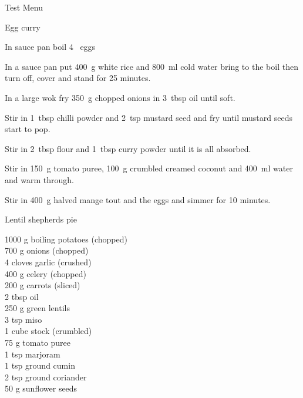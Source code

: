 \begin{menu}{Test Menu}
\begin{recipe}{2}{Egg curry}
    \begin{instructions}
    \item 
        In sauce pan boil
        4~  eggs\item 
      In a
      sauce pan
      put
      400~g  white rice
      and
      800~ml  cold water
      bring to the boil then turn off, cover and stand for 25 minutes.
    \item 
        In a large wok fry
        350~g chopped onions
        in
        3~tbsp  oil
        until soft.
      \item 
        Stir in 1~tbsp  chilli powder
        and
        2~tsp  mustard seed
        and fry until mustard seeds start to pop.
      \item 
        Stir in
        2~tbsp  flour
        and
        1~tbsp  curry powder
        until it is all absorbed.
      \item 
        Stir in
        150~g  tomato puree,
        100~g crumbled creamed coconut
        and
        400~ml  water
        and warm through.
      \item 
        Stir in
        400~g halved mange tout
        and the eggs
        and simmer for 10 minutes.
      
    \end{instructions}
    \end{recipe}%
  
    \begin{recipe}{2}{Lentil shepherds pie}%
    
		\begin{ingredients}
		1000 g boiling potatoes (chopped) \\
	700 g onions (chopped) \\
	4 cloves garlic (crushed) \\
	400 g celery (chopped) \\
	200 g carrots (sliced) \\
	2 tbsp oil  \\
	250 g green lentils  \\
	3 tsp miso  \\
	1 cube stock (crumbled) \\
	75 g tomato puree  \\
	1 tsp marjoram  \\
	1 tsp ground cumin  \\
	2 tsp ground coriander  \\
	50 g sunflower seeds  \\
	
		\end{ingredients}
	

\end{recipe}
\end{menu}
